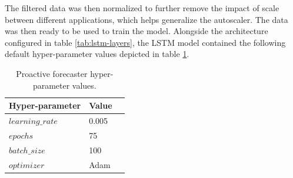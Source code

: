 \begin{center}
\begin{minipage}{\linewidth}
    \label{fig:lstm-smooth-data}
\end{minipage}
\end{center}

The filtered data was then normalized to further remove the impact of scale between different applications, which helps generalize the autoscaler. The data was then ready to be used to train the model. Alongside the architecture configured in table \ref{tab:lstm-layers}, the LSTM model contained the following default hyper-parameter values depicted in table \ref{tab:lstm-params}.

\begin{table}
    \caption{Proactive forecaster hyper-parameter values.}\label{tab:lstm-params}
    \centering
    \begin{tabular}{|l|l|l|}
        \hline
        Hyper-parameter & Value\\
        \hline
        $learning\_rate$ & 0.005\\
        $epochs$         & 75\\
        $batch\_size$    & 100\\
        $optimizer$      & Adam\\
        \hline
    \end{tabular}
\end{table}

